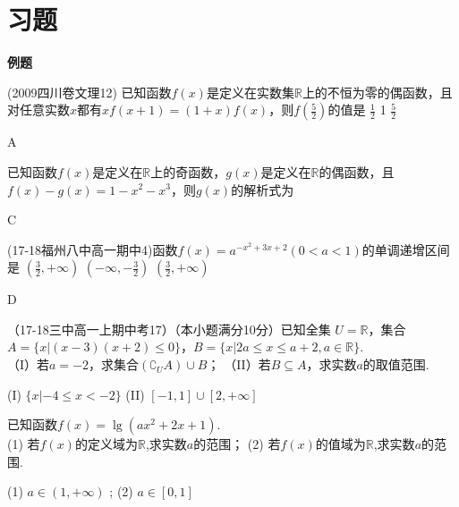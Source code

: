 \section{习题}
\startexercise
\begin{exercise}{\large \bf 例\hspace{0.6em}题}

\item
(2009四川卷文理12) 已知函数$f(x)$是定义在实数集$\mathbb{R}$上的不恒为零的偶函数，且对任意实数$x$都有$xf(x+1)=(1+x)f(x) $，则$f(\frac{5}{2}) $的值是\xz
{}
{$\frac12$}
{1}
{$\frac52$}
\begin{answer}
A
\end{answer}


\item
已知函数$f(x)$是定义在$\mathbb{R}$上的奇函数，$g(x)$是定义在$\mathbb{R} $的偶函数，且$f(x)-g(x)=1-x^2-x^3 $，则$g(x) $的解析式为\xz
{}
\begin{answer}
C
\end{answer}


\item
(17-18福州八中高一期中4)函数$f(x)=a^{-x^2+3x+2}(0<a<1)$的单调递增区间是\xz
        {$(\frac32,+\infty)$}
        {$(-\infty,-\frac32)$}
        {$(\frac32,+\infty)$}
\begin{answer}
D
\end{answer}

\item
（17-18三中高一上期中考17）（本小题满分10分）已知全集 $U=\mathbb{R}$，集合$A=\{x|(x-3)(x+2)\leq0\} $，$B=\{x|2a\leq x\leq a+2,a\in \mathbb{R} \} $.\\
（I）若$a=-2 $，求集合$(\complement_UA)\cup B $；
（II）若$B\subseteq A $，求实数$a $的取值范围.
\begin{answer}
 (I) $\{x|-4\leq x<-2 \} $
 (II) $[-1,1]\cup[2,+\infty] $
\end{answer}
\vspace{12em}

\item
已知函数$f(x)=\lg(ax^2+2x+1) $.\\
(1) 若$f(x)$的定义域为$\mathbb{R}$,求实数$a$的范围；
(2) 若$f(x)$的值域为$\mathbb{R}$,求实数$a$的范围.
\begin{answer}
(1) $a\in(1,+\infty)$ ;
(2) $a\in[0,1] $
\end{answer}
\vspace{12em}


\end{exercise}
